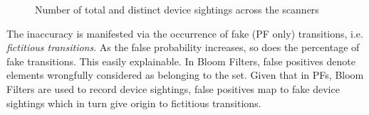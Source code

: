 \begin{figure}[htb]
 
\caption{Number of total and distinct device sightings across the scanners}
\label{fig:deviceSightings}
\end{figure}

The inaccuracy is manifested via the occurrence of fake (PF only)
transitions, i.e. \emph{fictitious transitions}. As the false
probability increases, so does the percentage of fake
transitions. This easily explainable. In Bloom Filters, false
positives denote elements wrongfully considered as belonging to the
set. Given that in PFs, Bloom Filters are used to record device
sightings, false positives map to fake device sightings which in turn
give origin to fictitious transitions.

